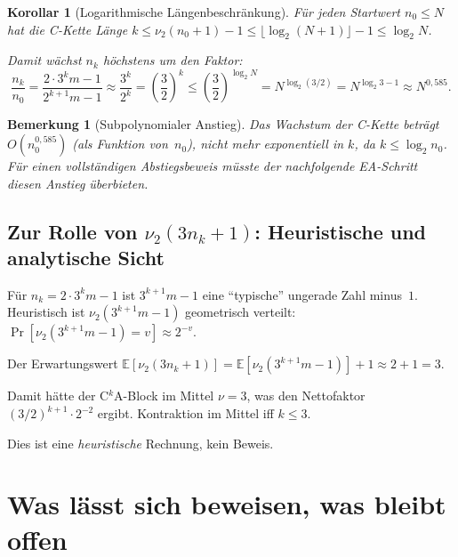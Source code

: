 \documentclass[12pt,a4paper]{article}
\newtheorem{korollar}[definition]{Korollar}
\newtheorem{bemerkung}[definition]{Bemerkung}
\newcommand{\vii}{\nu_2}
\begin{document}
	\begin{korollar}[Logarithmische Längenbeschränkung]
		\label{kor:log-laenge}
		Für jeden Startwert $n_0 \leq N$ hat die C-Kette Länge
		$k \leq \vii(n_0+1) - 1 \leq \lfloor\log_2(N+1)\rfloor - 1 \leq \log_2 N$.
		
		Damit wächst $n_k$ höchstens um den Faktor:
		\[
		\frac{n_k}{n_0}
		= \frac{2 \cdot 3^k m - 1}{2^{k+1}m - 1}
		\approx \frac{3^k}{2^k}
		= \left(\frac{3}{2}\right)^k
		\leq \left(\frac{3}{2}\right)^{\log_2 N}
		= N^{\log_2(3/2)}
		= N^{\log_2 3 - 1}
		\approx N^{0{,}585}.
		\]
	\end{korollar}
	
	\begin{bemerkung}[Subpolynomialer Anstieg]
		Das Wachstum der C-Kette beträgt $O(n_0^{0{,}585})$ (als Funktion von~$n_0$),
		nicht mehr exponentiell in $k$, da $k \leq \log_2 n_0$.
		Für einen vollständigen Abstiegsbeweis müsste der nachfolgende EA-Schritt
		diesen Anstieg überbieten.
	\end{bemerkung}
	
	\subsection{Zur Rolle von $\nu_2(3n_k+1)$: Heuristische und analytische Sicht}
	
	\begin{tcolorbox}[warnung, title={Heuristisches Argument}]
		Für $n_k = 2 \cdot 3^k m - 1$ ist $3^{k+1}m - 1$ eine ``typische'' ungerade Zahl
		minus~$1$. Heuristisch ist $\vii(3^{k+1}m-1)$ geometrisch verteilt:
		$\Pr[\vii(3^{k+1}m-1) = v] \approx 2^{-v}$.
		
		Der Erwartungswert $\mathbb{E}[\vii(3n_k+1)] = \mathbb{E}[\vii(3^{k+1}m-1)] + 1 \approx 2 + 1 = 3$.
		
		Damit hätte der C$^k$A-Block im Mittel $\nu = 3$, was den Nettofaktor
		$(3/2)^{k+1} \cdot 2^{-2}$ ergibt. Kontraktion im Mittel iff $k \leq 3$.
		
		Dies ist eine \emph{heuristische} Rechnung, kein Beweis.
	\end{tcolorbox}
	
	\section{Was lässt sich beweisen, was bleibt offen}
	\label{sec:fazit}
	
\end{document}
